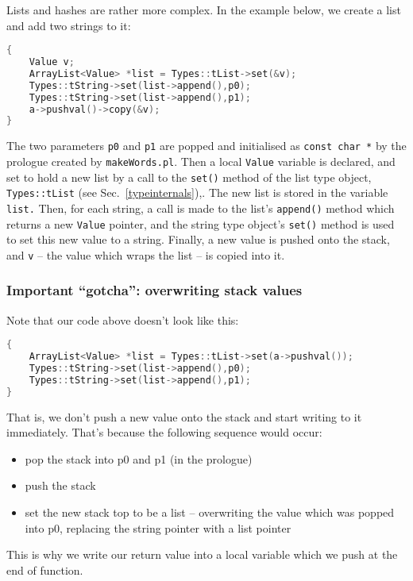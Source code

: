 Lists and hashes are rather more complex. In the example below,
we create a list and add two strings to it:
\begin{lstlisting}[language=c++]
%wordargs stringstolist ss (string string -- list) list from two strings
{
    Value v;
    ArrayList<Value> *list = Types::tList->set(&v);
    Types::tString->set(list->append(),p0);
    Types::tString->set(list->append(),p1);
    a->pushval()->copy(&v);
}
\end{lstlisting}
The two parameters \texttt{p0} and \texttt{p1} are popped and
initialised as \texttt{const char *} by the prologue created
by \texttt{makeWords.pl}. Then a local \texttt{Value} variable
is declared,
and set to hold a new list by a call to the \texttt{set()} method
of the list type object, \texttt{Types::tList} (see Sec.~\ref{typeinternals}),.
The new list is stored in the variable \texttt{list.} 
Then, for each string, a call is made to the list's \texttt{append()} method
which returns a new \texttt{Value} pointer, and the string type
object's \texttt{set()} method is used to set this new value to a string.
Finally, a new value is pushed onto the stack, and \texttt{v} -- the value
which wraps the list -- is copied into it.

\subsubsection{Important ``gotcha'': overwriting stack values}
Note that our code above doesn't look like this:
\begin{lstlisting}[language=c++]
%wordargs stringstolist ss (string string -- list) list from two strings
{
    ArrayList<Value> *list = Types::tList->set(a->pushval());
    Types::tString->set(list->append(),p0);
    Types::tString->set(list->append(),p1);
}
\end{lstlisting}
That is, we don't push a new value onto the stack and start writing
to it immediately. That's because the following sequence would occur:
\begin{itemize}
\item pop the stack into p0 and p1 (in the prologue)
\item push the stack
\item set the new stack top to be a list -- overwriting the value
which was popped into p0, replacing the string pointer with a list
pointer
\end{itemize}
This is why we write our return value into a local variable which
we push at the end of function.

